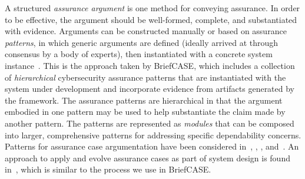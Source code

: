 A structured \textit{assurance argument} is one method for conveying assurance.
In order to be effective, the argument should be well-formed, complete, and substantiated with evidence.    
Arguments can be constructed manually or based on assurance \textit{patterns}, in which generic arguments are defined (ideally arrived at through consensus by a body of experts), then instantiated with a concrete system instance~\cite{Kelly97:patterns}.  This is the approach taken by BriefCASE, which includes a collection of \textit{hierarchical} cybersecurity assurance patterns that are instantiated with the system under development and incorporate evidence from artifacts generated by the framework.  
The assurance patterns are hierarchical in that the argument embodied in one pattern may be used to help substantiate the claim made by another pattern.  The patterns are  represented as \textit{modules} that can be composed into larger, comprehensive patterns for addressing specific dependability concerns. 
%
Patterns for assurance case argumentation have been considered in~\cite{Denney13:pattern}, \cite{Hawkins11:pattern}, \cite{Kelly97:patterns}, and~\cite{Sun11:pattern}. An approach to apply and evolve assurance cases as part of system design is found in~\cite{Graydon07:dev}, which is similar to the process we use in BriefCASE.

